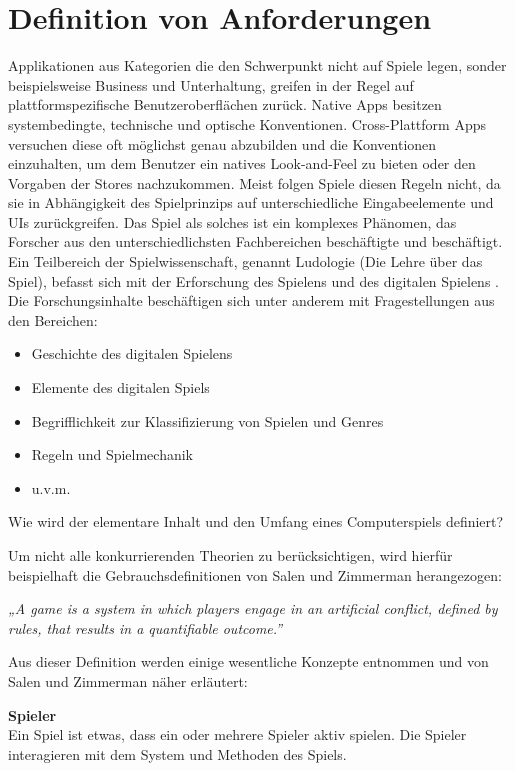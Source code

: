 \section{Definition von Anforderungen}
\label{sec:definition_anforderungen}
Applikationen aus Kategorien die den Schwerpunkt nicht auf Spiele legen, sonder beispielsweise Business und Unterhaltung, greifen in der Regel auf plattformspezifische Benutzeroberflächen zurück. Native Apps besitzen systembedingte, technische und optische Konventionen. Cross-Plattform Apps versuchen diese oft möglichst genau abzubilden und die Konventionen einzuhalten, um dem Benutzer ein natives Look-and-Feel zu bieten oder den Vorgaben der Stores nachzukommen. 
Meist folgen Spiele diesen Regeln nicht, da sie in Abhängigkeit des Spielprinzips auf unterschiedliche Eingabeelemente und UIs zurückgreifen. 
Das Spiel als solches ist ein komplexes Phänomen, das Forscher aus den unterschiedlichsten Fachbereichen beschäftigte und beschäftigt. Ein Teilbereich der Spielwissenschaft, genannt Ludologie (Die Lehre über das Spiel), befasst sich mit der Erforschung des Spielens und des digitalen Spielens \citep{ludologie}. Die Forschungsinhalte beschäftigen sich unter anderem mit Fragestellungen aus den Bereichen:

\begin{itemize}
	\item Geschichte des digitalen Spielens
	\item Elemente des digitalen Spiels
	\item Begrifflichkeit zur Klassifizierung von Spielen und Genres
	\item Regeln und Spielmechanik
	\item u.v.m.
\end{itemize}


Wie wird der elementare Inhalt und den Umfang eines Computerspiels definiert?

\bigskip
Um nicht alle konkurrierenden Theorien zu berücksichtigen, wird hierfür beispielhaft die Gebrauchsdefinitionen von Salen und Zimmerman herangezogen:

\bigskip
\emph{„A game is a system in which players engage in an artificial conflict, defined by rules, that results in a quantifiable outcome.”} \citep[80]{salen_zimmerman}
\bigskip

Aus dieser Definition werden einige wesentliche Konzepte entnommen und von Salen und Zimmerman näher erläutert:

\bigskip
\textbf{Spieler}\\
Ein Spiel ist etwas, dass ein oder mehrere Spieler aktiv spielen. Die Spieler interagieren mit dem System und Methoden des Spiels.

